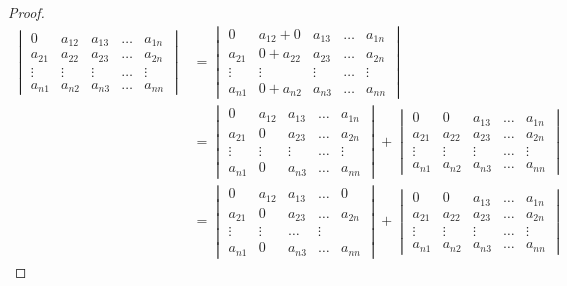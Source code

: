 \documentclass[leqno,autodetect-engine,dvipdfmx-if-dvi,ja=standard,a4paper,12pt]{bxjsbook}
\begin{document}
\begin{proof}
						\begin{align}
							\begin{vmatrix}
								0 & a_{1 2} & a_{1 3} & \dots & a_{1 n} \\
								a_{2 1} & a_{2 2} & a_{2 3} & \dots & a_{2 n} \\
								\vdots & \vdots & \vdots & \dots & \vdots \\
								a_{n 1} & a_{n 2} & a_{n 3} & \dots & a_{n n}
							\end{vmatrix}
							&= \begin{vmatrix}
								0 & a_{1 2} + 0 & a_{1 3} & \dots & a_{1 n} \\
								a_{2 1} & 0+ a_{2 2} & a_{2 3} & \dots & a_{2 n} \\
								\vdots & \vdots & \vdots & \dots & \vdots \\
								a_{n 1} & 0 + a_{n 2} & a_{n 3} & \dots & a_{n n}
							\end{vmatrix} \\
							&= \begin{vmatrix}
								0 & a_{1 2} & a_{1 3} & \dots & a_{1 n} \\
								a_{2 1}  & 0 & a_{2 3}& \dots & a_{2 n} \\
								\vdots & \vdots & \vdots & \dots & \vdots \\
								a_{n 1} & 0 & a_{n 3} & \dots & a_{n n}
							\end{vmatrix} 
							+
							\begin{vmatrix}
								0 & 0  & a_{1 3} & \dots & a_{1 n} \\
								a_{2 1} & a_{2 2} & a_{2 3} & \dots & a_{2 n} \\
								\vdots & \vdots & \vdots & \dots & \vdots \\
								a_{n 1} & a_{n 2} & a_{n 3} & \dots & a_{n n}
							\end{vmatrix} \\
							&= \begin{vmatrix}
								0 & a_{1 2} & a_{1 3} & \dots & 0 \\
								a_{2 1}  & 0 & a_{2 3} & \dots & a_{2 n} \\
								\vdots & \vdots & \dots & \vdots \\
								a_{n 1} & 0 & a_{n 3} & \dots & a_{n n}
							\end{vmatrix} 
							+
							\begin{vmatrix}
								0 & 0 & a_{1 3} &\dots & a_{1 n} \\
								a_{2 1} & a_{2 2} & a_{2 3} & \dots & a_{2 n} \\
								\vdots & \vdots & \vdots & \dots & \vdots \\
								a_{n 1} & a_{n 2} & a_{n 3} & \dots & a_{n n}
							\end{vmatrix}
						\end{align}
					

\end{proof}
\end{document}
